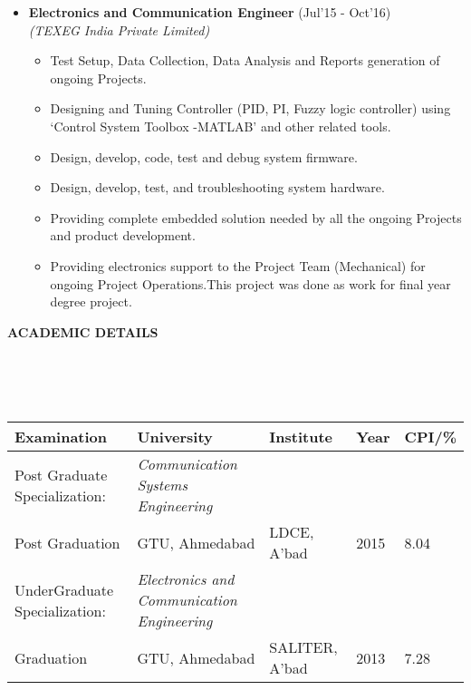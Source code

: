 \documentclass[a4paper,10pt]{article}
\newcommand{\isep}{-2 pt}
\newcommand{\lsep}{-0.5cm}
\newcommand{\resheading}[1]{{\small \colorbox{mygrey}{\begin{minipage}{0.975\textwidth}{\textbf{#1 \vphantom{p\^{E}}}}\end{minipage}}}}
\begin{document}
\begin{itemize}
\item \textbf{Electronics and Communication Engineer} (Jul'15 - Oct'16) \\
 \emph{(TEXEG India Private Limited)} \\[-0.6cm]
	\begin{itemize}\itemsep \isep
	\item Test Setup, Data Collection, Data Analysis and Reports generation of ongoing Projects.
	\item Designing and Tuning Controller (PID, PI, Fuzzy logic controller) using ‘Control System Toolbox -MATLAB’ and other related tools.
	\item Design, develop, code, test and debug system firmware.
	\item Design, develop, test, and troubleshooting system hardware.
	\item Providing complete embedded solution needed by all the ongoing Projects and product development.
	\item Providing electronics support to the Project Team (Mechanical) for ongoing Project Operations.This project was done as work for final year degree project.
	\end{itemize}
\end{itemize}

\resheading{\textbf{ACADEMIC DETAILS} }\\[\lsep]
\\ \\
\indent \begin{tabular}{ l @{\hskip 0.15in} l @{\hskip 0.15in} l @{\hskip 0.15in} l @{\hskip 0.15in} l }
\hline
\textbf{Examination} & \textbf{University} & \textbf{Institute} & \textbf{Year} & \textbf{CPI/\%} \\
\hline
Post Graduate Specialization:\,\, & \textit{Communication Systems Engineering} \\
Post Graduation & GTU, Ahmedabad & LDCE, A'bad & 2015 & 8.04 \\
UnderGraduate Specialization: & \textit{Electronics and Communication Engineering} \\
Graduation & GTU, Ahmedabad & SALITER, A'bad & 2013 & 7.28\\
\hline
\end{tabular}
\\ \\
\end{document}
